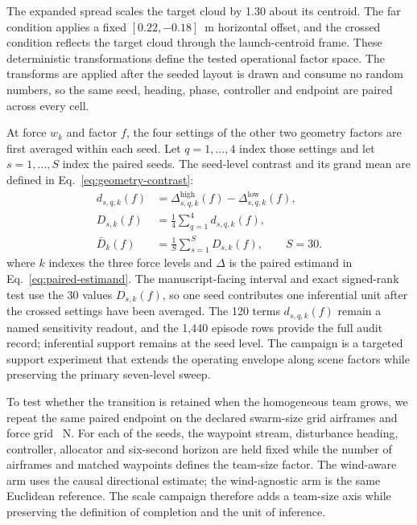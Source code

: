 The expanded spread scales the target cloud by 1.30 about its centroid. The far
condition applies a fixed $[0.22,-0.18]$~m horizontal offset, and the crossed
condition reflects the target cloud through the launch-centroid frame. These
deterministic transformations define the tested operational factor space.
The transforms are applied after the seeded layout is drawn and consume no random
numbers, so the same seed, heading, phase, controller and endpoint are paired
across every cell.

At force $w_k$ and factor $f$, the four settings of the other two geometry factors
are first averaged within each seed. Let $q=1,\ldots,4$ index those settings and
let $s=1,\ldots,S$ index the paired seeds. The seed-level contrast and its grand
mean are defined in Eq.~\eqref{eq:geometry-contrast}:
\begin{equation}
  \begin{aligned}
  d_{s,q,k}(f)&=\Delta_{s,q,k}^{\mathrm{high}}(f)-
    \Delta_{s,q,k}^{\mathrm{low}}(f),\\
  D_{s,k}(f)&=\frac{1}{4}\sum_{q=1}^{4}d_{s,q,k}(f),\\
  \bar D_k(f)&=\frac{1}{S}\sum_{s=1}^{S}D_{s,k}(f),
  \qquad S=30.
  \end{aligned}
  \label{eq:geometry-contrast}
\end{equation}
where $k$ indexes the three force levels and $\Delta$ is the paired estimand in
Eq.~\eqref{eq:paired-estimand}. The manuscript-facing interval and exact
signed-rank test use the 30 values $D_{s,k}(f)$, so one seed contributes one
inferential unit after the crossed settings have been averaged. The 120 terms
$d_{s,q,k}(f)$ remain a named sensitivity readout, and the 1,440 episode rows provide
the full audit record; inferential support remains at the seed level. The campaign is a targeted
support experiment that extends the operating envelope along scene factors while
preserving the primary seven-level sweep.

To test whether the transition is retained when the homogeneous team grows, we
repeat the same paired endpoint on the declared swarm-size grid
\ScaleSizeGrid{} airframes and force grid \ScaleForceGrid{}~N. For each of the
\NScaleSeeds{} seeds, the waypoint stream, disturbance heading, controller,
allocator and six-second horizon are held fixed while the number of airframes and
matched waypoints defines the team-size factor. The wind-aware arm uses the causal
directional estimate; the wind-agnostic arm is the same Euclidean reference.
The scale campaign therefore adds a team-size axis while preserving the definition
of completion and the unit of inference.

